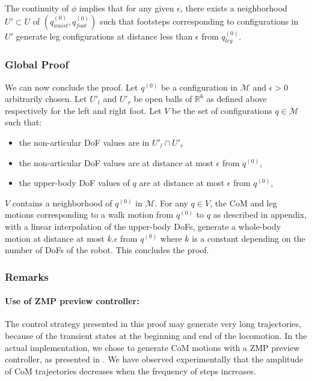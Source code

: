 \documentclass{article}
\begin{document}
The continuity of $\phi$ implies that for any given $\epsilon$,  
there exists a neighborhood $U'\subset U$ of $(q_{waist}^{(0)}, q_{foot}^{(0)})$ such that 
footsteps corresponding to configurations in $U'$ generate leg configurations at distance 
less than $\epsilon$ from $ q_{leg}^{(0)}$.



\subsubsection{Global Proof}

We can now conclude the proof. Let $q^{(0)}$ be a configuration in
$\mathcal{M}$ and $\epsilon >0$ arbitrarily chosen. Let $U'_l$ and $U'_r$ be
open balls of $\mathbb{R}^6$ as defined above respectively for the left and right
foot. Let $V$  be the set of configurations $q \in \mathcal{M}$ such that: 
\begin{itemize}
\item the non-articular DoF values are in $U'_l \cap U'_r$
\item the non-articular DoF values are at distance at most 
	$\epsilon$ from $q^{(0)}$,
\item the upper-body DoF values of $q$ are at distance 
	at most $\epsilon$ from  $q^{(0)}$,
\end{itemize}
$V$ contains a neighborhood of $q^{(0)}$ in $\mathcal{M}$. For any $q \in V$,
the CoM and leg motions corresponding to a walk motion from $q^{(0)}$ to $q$ as described
in appendix, with a linear interpolation of the upper-body DoFs, generate a whole-body
motion at distance at most $k.\epsilon$ from $q^{(0)}$ 
where $k$ is a constant depending on the number
of DoFs of the robot. This concludes the proof. 

\subsubsection{Remarks}
\paragraph{Use of ZMP preview controller:} The control strategy presented in this proof may
generate very  long trajectories, because  of the transient  states at
the beginning and end of the locomotion. In the actual implementation,
we chose  to generate  CoM motions with  a ZMP preview  controller, as
presented in \cite{kajita2003biped}.  We  have observed experimentally that the
amplitude of  CoM trajectories decreases  when the frequency  of steps
increases.
\end{document}
